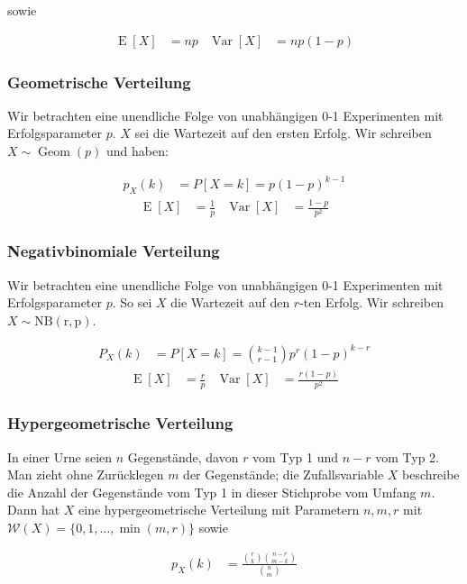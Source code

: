 \documentclass[25pt]{sciposter}
\newcommand{\W}{\mathcal{W}}
\newcommand{\Var}{\operatorname{Var}}
\newcommand{\E}{\operatorname{E}}
\begin{document}
\begin{multicols}{3}
sowie 

\begin{align*}
	\E[X] &= np & \Var[X] &= np(1-p)
\end{align*}


\subsubsection*{Geometrische Verteilung}
Wir betrachten eine unendliche Folge von unabhängigen 0-1 Experimenten mit Erfolgsparameter $p$. $X$ sei die Wartezeit auf den ersten Erfolg. Wir schreiben $X\sim\operatorname{Geom}(p)$ und haben:

\begin{align*}
	p_X(k) &= P[X=k] = p(1-p)^{k-1}
\end{align*}
\begin{align*}
	\E[X] &= \frac{1}{p} & \Var[X] &= \frac{1-p}{p^2}
\end{align*}


\subsubsection*{Negativbinomiale Verteilung}
Wir betrachten eine unendliche Folge von unabhängigen 0-1 Experimenten mit Erfolgsparameter $p$. So sei $X$ die Wartezeit auf den $r$-ten Erfolg. Wir schreiben $X\sim \operatorname{NB(r,p)}$.

\begin{align*}
	P_X(k) &= P[X = k] = {k-1 \choose r-1} p^r(1-p)^{k-r}
\end{align*}
\begin{align*}
\E[X] &= \frac{r}{p} & \Var[X] &= \frac{r(1-p)}{p^2}
\end{align*}

\subsubsection*{Hypergeometrische Verteilung}
In einer Urne seien $n$ Gegenstände, davon $r$ vom Typ 1 und $n-r$ vom Typ 2. Man
zieht ohne Zurücklegen $m$ der Gegenstände; die Zufallsvariable $X$ beschreibe die Anzahl
der Gegenstände vom Typ 1 in dieser Stichprobe vom Umfang $m$. Dann hat $X$ eine
hypergeometrische Verteilung mit Parametern $n,m,r$ mit $\W(X) = \{0, 1, \ldots, \min(m, r)\}$ sowie

\begin{align*}
	p_X(k) &= \frac{{r\choose k} {n-r \choose m-k}}{{n \choose m}}
\end{align*}


\end{multicols}
\end{document}
